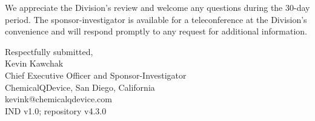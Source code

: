 \noindent We appreciate the Division's review and welcome any questions during the 30-day period. The sponsor-investigator is available for a teleconference at the Division's convenience and will respond promptly to any request for additional information.

\noindent Respectfully submitted, \\[1.0em]
Kevin Kawchak \\
Chief Executive Officer and Sponsor-Investigator \\
ChemicalQDevice, San Diego, California \\
kevink@chemicalqdevice.com \\
IND v1.0; repository v4.3.0
